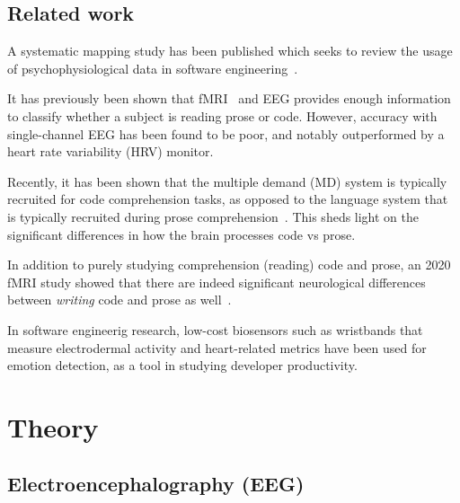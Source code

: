 \documentclass[a4paper]{article}
\begin{document}
\begin{refsection}

\subsection{Related work}

    A systematic mapping study has been published which seeks to review the usage of psychophysiological data in software engineering~\cite{vieira_usage_2021}.

    It has previously been shown that fMRI~\cite{floyd_decoding_2017} and EEG\cite{fucci_replication_2019} provides enough information to classify whether a subject is reading prose or code. However, accuracy with single-channel EEG has been found to be poor, and notably outperformed by a heart rate variability (HRV) monitor.

    Recently, it has been shown that the multiple demand (MD) system is typically recruited for code comprehension tasks, as opposed to the language system that is typically recruited during prose comprehension~\cite{ivanova_comprehension_2020}. This sheds light on the significant differences in how the brain processes code vs prose.

    In addition to purely studying comprehension (reading) code and prose, an 2020 fMRI study showed that there are indeed significant neurological differences between \emph{writing} code and prose as well~\cite{noauthor_neurological_nodate}.

    In software engineerig research, low-cost biosensors such as wristbands that measure electrodermal activity and heart-related metrics have been used for emotion detection, as a tool in studying developer productivity.


\section{Theory}

    \subsection{Electroencephalography (EEG)}


\end{refsection}
\end{document}
